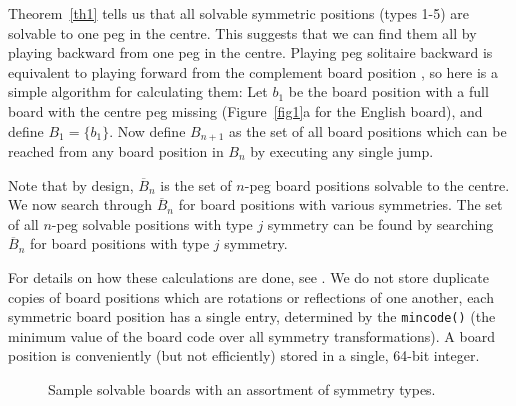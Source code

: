 \documentclass[12pt,reqno]{article}
\begin{document}
Theorem~\ref{th1} tells us that all solvable symmetric positions (types 1-5) are solvable to one peg in the centre.
This suggests that we can find them all by playing backward from one peg in the centre.
Playing peg solitaire backward is equivalent to playing forward from the
complement board position \cite{WinningWays, GPJ04},
so here is a simple algorithm for calculating them:
Let $b_1$ be the board position with a full board with the centre peg missing
(Figure~\ref{fig1}a for the English board),
and define $B_1=\{b_1\}$.
Now define $B_{n+1}$ as the set of all board positions which can be reached from any board position in
$B_n$ by executing any single jump.

Note that by design, $\overline{B}_n$ is the set of $n$-peg board positions solvable to the centre.
We now search through $\overline{B}_n$ for board positions with various symmetries.
The set of all $n$-peg solvable positions with type $j$ symmetry
can be found by searching $\overline{B}_n$ for board positions with type $j$ symmetry.

For details on how these calculations are done, see \cite{BellNotes}.
We do not store duplicate copies of board positions which are rotations or reflections of one another,
each symmetric board position has a single entry, determined by the {\tt mincode()}
(the minimum value of the board code over all symmetry transformations).
A board position is conveniently (but not efficiently) stored in a single, 64-bit integer.

\begin{figure}[htb]
\centering
{}
\caption{Sample solvable boards with an assortment of symmetry types.}
\label{fig5}
\end{figure}
\end{document}
